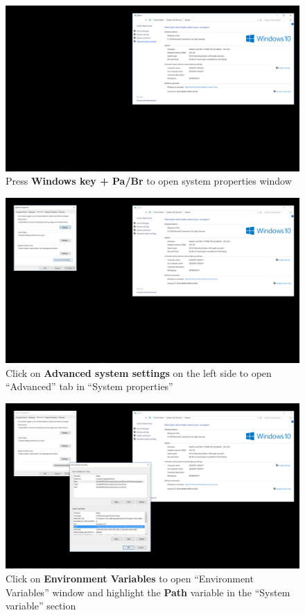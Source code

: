 \documentclass[a4paper,oneside]{book}
\numberwithin{equation}{chapter}
\begin{document}
	\begin{figure}[H]
		\centering	\includegraphics[width=15cm]{wfigextra2}
		\caption{Press \textbf{Windows key + Pa/Br} to open system properties window}
	\end{figure}
	\begin{figure}[H]
		\centering	\includegraphics[width=15cm]{wfigextra3}
		\caption{Click on \textbf{Advanced system settings} on the left side to open ``Advanced'' tab in ``System properties''}
	\end{figure}
	\begin{figure}[H]
		\centering	\includegraphics[width=15cm]{wfigextra4}
		\caption{Click on \textbf{Environment Variables} to open ``Environment Variables'' window and highlight the \textbf{Path} variable in the ``System variable'' section}
	\end{figure}
\end{document}
